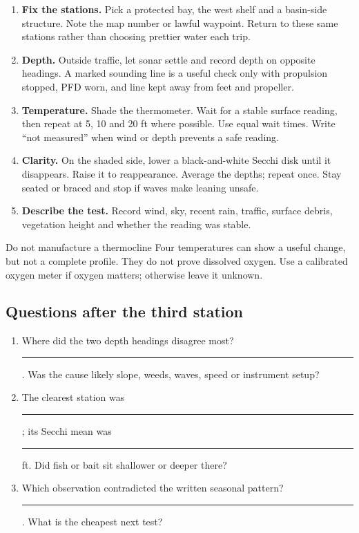 \begin{enumerate}
\item \textbf{Fix the stations.} Pick a protected bay, the west shelf and a
basin-side structure. Note the map number or lawful waypoint. Return to these
same stations rather than choosing prettier water each trip.
\item \textbf{Depth.} Outside traffic, let sonar settle and record depth on
opposite headings. A marked sounding line is a useful check only with
propulsion stopped, PFD worn, and line kept away from feet and propeller.
\item \textbf{Temperature.} Shade the thermometer. Wait for a stable surface
reading, then repeat at 5, 10 and 20 ft where possible. Use equal wait times.
Write ``not measured'' when wind or depth prevents a safe reading.
\item \textbf{Clarity.} On the shaded side, lower a black-and-white Secchi disk
until it disappears. Raise it to reappearance. Average the depths; repeat once.
Stay seated or braced and stop if waves make leaning unsafe.
\item \textbf{Describe the test.} Record wind, sky, recent rain, traffic,
surface debris, vegetation height and whether the reading was stable.
\end{enumerate}

\begin{telospanel}{Do not manufacture a thermocline}
Four temperatures can show a useful change, but not a complete profile. They
do not prove dissolved oxygen. Use a calibrated oxygen meter if oxygen matters;
otherwise leave it unknown.
\end{telospanel}

\subsection{Questions after the third station}
\begin{enumerate}
\item Where did the two depth headings disagree most? \rule{1.2in}{.4pt}.
Was the cause likely slope, weeds, waves, speed or instrument setup?
\item The clearest station was \rule{1.1in}{.4pt}; its Secchi mean was
\rule{.55in}{.4pt} ft. Did fish or bait sit shallower or deeper there?
\item Which observation contradicted the written seasonal pattern?
\rule{2.6in}{.4pt}. What is the cheapest next test?
\end{enumerate}

